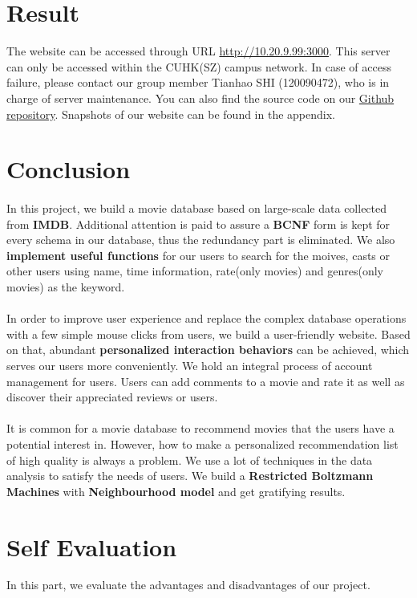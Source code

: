 \begin{CJK*}{UTF8}{gbsn}
\section{Result}
The website can be accessed through URL \href{http://10.20.9.99:3000}{http://10.20.9.99:3000}. This server can only be accessed within the CUHK(SZ) campus network. In case of access failure, please contact our group member Tianhao SHI (120090472), who is in charge of server maintenance. You can also find the source code on our \href{https://github.com/warin2020/rotten-potatoes}{Github repository}. Snapshots of our website can be found in the appendix.
\section{Conclusion}
\paragraph{} In this project, we build a movie database based on large-scale data collected from \textbf{IMDB}. Additional attention is paid to assure a \textbf{BCNF} form is kept for every schema in our database, thus the redundancy part is eliminated. We also \textbf{implement useful functions} for our users to search for the moives, casts or other users using name,  time information, rate(only movies) and genres(only movies) as the keyword.
\paragraph{} In order to improve user experience and replace the complex database operations with a few simple mouse clicks from users, we build a user-friendly website. Based on that, abundant \textbf{personalized interaction behaviors} can be achieved, which serves our users more conveniently. We hold an integral process of account management for users. Users can add comments to a movie and rate it as well as discover their appreciated reviews or users.
\paragraph{} It is common for a movie database to recommend movies that the users have a potential interest in. However, how to make a personalized recommendation list of high quality is always a problem. We use a lot of techniques in the data analysis to satisfy the needs of users. We build a \textbf{Restricted Boltzmann Machines}  with \textbf{Neighbourhood model} and get gratifying results.
\section{Self Evaluation}
In this part, we evaluate the advantages and disadvantages of our project.

\end{CJK*}
